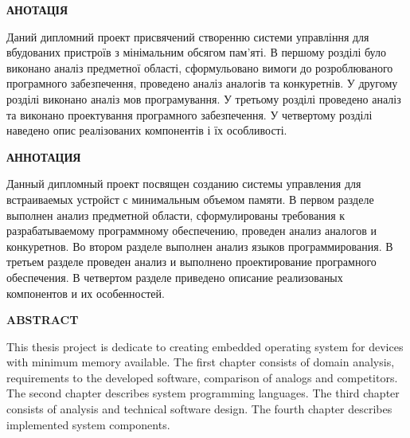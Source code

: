 \documentclass[main.tex]{subfiles}
\begin{document}
\begin{specialpage}
  \begin{spacing}{1.5}

  \textbf{АНОТАЦІЯ}\\
  \vspace{5mm}
  \begin{minipage}{\textwidth}
  Даний дипломний проект присвячений створенню системи управління для вбудованих пристроїв з мінімальним обсягом пам'яті. В першому розділі було виконано аналіз предметної області, сформульовано вимоги до розроблюваного програмного забезпечення, проведено аналіз аналогів та конкуретнів.
  У другому розділі виконано аналіз мов програмування.
  У третьому розділі проведено аналіз та виконано проектування програмного забезпечення.
  У четвертому розділі наведено опис реалізованих компонентів і їх особливості.
  \end{minipage}

  \vspace{1cm}
  \textbf{АННОТАЦИЯ}\\
  \vspace{5mm}
  \begin{minipage}{\textwidth}
  Данный дипломный проект посвящен созданию системы управления для встраиваемых устройст с минимальным объемом памяти. В первом разделе выполнен анализ предметной области, сформулированы требования к разрабатываемому программному обеспечению, проведен анализ аналогов и конкуретнов.
  Во втором разделе выполнен анализ языков программирования.
  В третьем разделе проведен анализ и выполнено проектирование програмного обеспечения.
  В четвертом разделе приведено описание реализованых компонентов и их особенностей.
  \end{minipage}

  \vspace{1cm}
  \textbf{ABSTRACT}\\
  \vspace{5mm}
  \begin{minipage}{\textwidth}
  This thesis project is dedicate to creating embedded operating system for devices with minimum memory available. The first chapter consists of domain analysis, requirements to the developed software, comparison of analogs and competitors.
  The second chapter describes system programming languages.
  The third chapter consists of analysis and technical software design.
  The fourth chapter describes implemented system components.
  \end{minipage}

  \end{spacing}
\end{specialpage}
\end{document}
